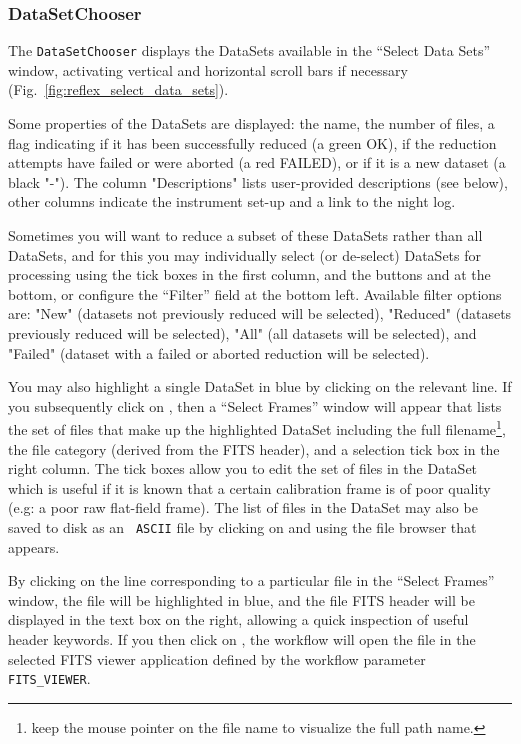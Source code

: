 

\subsubsection{DataSetChooser}
 \label{sec:dataset_chooser}


 The {\tt DataSetChooser} displays the DataSets available in the
 ``Select Data Sets'' window, activating vertical and horizontal
 scroll bars if necessary (Fig.~\ref{fig:reflex_select_data_sets}). 

 Some properties of the DataSets are displayed: the name, the number
 of files, a flag indicating if it has been successfully reduced (a
 green OK), if the reduction attempts have failed or were aborted (a
 red FAILED), or if it is a new dataset (a black "-"). The column
 "Descriptions" lists user-provided descriptions (see below), other
 columns indicate the instrument set-up and a link to the night log.


 Sometimes you will want to reduce a subset of these DataSets rather
 than all DataSets, and for this you may individually select (or
 de-select) DataSets for processing using the tick boxes in the first
 column, and the buttons  and  at the bottom, or configure the ``Filter'' field at the
 bottom left. Available filter options are: "New" (datasets not
 previously reduced will be selected), "Reduced" (datasets previously
 reduced will be selected), "All" (all datasets will be selected), and
 "Failed" (dataset with a failed or aborted reduction will be
 selected).


 You may also highlight a single DataSet in blue by clicking on the
 relevant line. If you subsequently click on , then a ``Select Frames'' window will appear that
 lists the set of files that make up the highlighted DataSet including
 the full filename\footnote{keep the mouse pointer on the file
   name to visualize the full path name.}, the file category
 (derived from the FITS header), and a selection tick box in the right
 column. The tick boxes allow you to edit the set of files in the
 DataSet which is useful if it is known that a certain calibration
 frame is of poor quality (e.g: a poor raw flat-field frame).  The
 list of files in the DataSet may also be saved to disk as an {\tt
   ASCII} file by clicking on  and using the file
 browser that appears.

  By clicking on the line corresponding to a particular file in the
  ``Select Frames'' window, the file will be highlighted in blue, and
  the file FITS header will be displayed in the text box on the right,
  allowing a quick inspection of useful header keywords.  If you then
  click on , the workflow will open the file in the
  selected FITS viewer application defined by the workflow parameter
  {\tt FITS\_VIEWER}.

